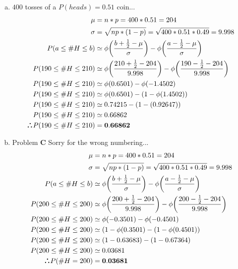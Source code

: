 \documentclass[10pt]{report}
\def\therefore{\boldsymbol{\text{ }
\leavevmode
\lower0.4ex\hbox{$\cdot$}
\kern-.5em\raise0.7ex\hbox{$\cdot$}
\kern-0.6em\lower0.4ex\hbox{$\cdot$}
\thinspace\text{ }}}
\begin{document}
  \subsection{}
 \begin{enumerate}[(a)]
\item $400 $ tosses of a $P(heads)=0.51 $ coin...
\begin{align*}
\mu &= n*p = 400*0.51 = 204\\
\sigma &= \sqrt{np*(1-p)} = \sqrt{400*0.51*0.49} = 9.998\\
P(a \leq \#H \leq b) &\simeq \phi \bigg(\frac{b+\frac{1}{2} - \mu}{\sigma}\bigg) - \phi \bigg(\frac{a-\frac{1}{2} - \mu}{\sigma}\bigg) \\
P(190 \leq \#H \leq 210) &\simeq \phi \bigg(\frac{210+\frac{1}{2} - 204}{9.998}\bigg) - \phi \bigg(\frac{190-\frac{1}{2} - 204}{9.998}\bigg) \\
P(190 \leq \#H \leq 210) &\simeq \phi (0.6501) - \phi(-1.4502) \\
P(190 \leq \#H \leq 210) &\simeq \phi (0.6501) - (1-\phi(1.4502)) \\
P(190 \leq \#H \leq 210) &\simeq 0.74215 - (1-(0.92647)) \\
P(190 \leq \#H \leq 210) &\simeq 0.66862 \\
\therefore P(190 \leq \#H \leq 210) &= \mathbf{0.66862} \\
\end{align*}
\item Problem \textbf{C} Sorry for the wrong numbering...
\begin{align*}
\mu &= n*p = 400*0.51 = 204\\
\sigma &= \sqrt{np*(1-p)} = \sqrt{400*0.51*0.49} = 9.998\\
P(a \leq \#H \leq b) &\simeq \phi \bigg(\frac{b+\frac{1}{2} - \mu}{\sigma}\bigg) - \phi \bigg(\frac{a-\frac{1}{2} - \mu}{\sigma}\bigg) \\
P(200 \leq \#H \leq 200) &\simeq \phi \bigg(\frac{200+\frac{1}{2} - 204}{9.998}\bigg) - \phi \bigg(\frac{200-\frac{1}{2} - 204}{9.998}\bigg) \\
P(200 \leq \#H \leq 200) &\simeq \phi (-0.3501) - \phi(-0.4501) \\
P(200 \leq \#H \leq 200) &\simeq (1- \phi (0.3501) - (1-\phi(0.4501)) \\
P(200 \leq \#H \leq 200) &\simeq (1-0.63683) - (1-0.67364) \\
P(200 \leq \#H \leq 200) &\simeq 0.03681 \\
\therefore P(\#H = 200) &= \mathbf{0.03681} \\

\end{align*}
\end{enumerate}
\end{document}
